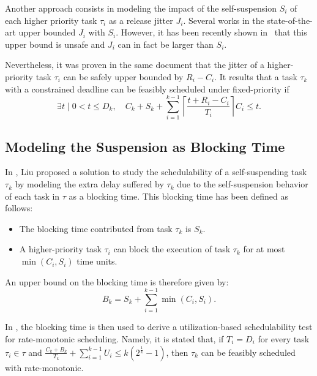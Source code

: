\documentclass[10pt,conference,preprint]{IEEEtran}
\newcommand{\ceiling}[1]{\left\lceil{#1}\right\rceil}
\begin{document}
Another approach consists in modeling the impact of the self-suspension $S_i$ of each higher priority task $\tau_i$ as a release jitter $J_i$. Several works in the state-of-the-art \cite{ECRTS-AudsleyB04,RTAS-AudsleyB04,RTCSA-KimCPKH95,MingLiRTCSA1994} upper bounded $J_i$ with $S_i$. However, it has been recently shown in~\cite{BletsasReport2015} that this upper bound is unsafe and $J_i$ can in fact be larger than $S_i$. 

Nevertheless, it was proven in the same document \cite{BletsasReport2015} that the jitter of a higher-priority task $\tau_i$ can be safely upper bounded by $R_i-C_i$. It results that a task
$\tau_k$ with a constrained deadline can be feasibly scheduled under fixed-priority if
\begin{equation}
\label{eq:TDA-jitter}
\exists t \mid 0 < t \leq D_k, \quad C_k + S_k + \sum_{i=1}^{k-1}\ceiling{\frac{t+R_i-C_i}{T_i}} C_i \leq t.
\end{equation}

\subsection{Modeling the Suspension as Blocking Time}
\label{sec:suspension-blocking}

In \cite[p. 164-165]{Liu:2000:RS:518501}, Liu proposed a solution to study the schedulability of a self-suspending task $\tau_k$ by modeling the extra delay suffered by $\tau_k$ due to the self-suspension behavior of each task in $\tau$ as a blocking time. This blocking time has been defined as follows:
\begin{itemize}
\item The blocking time contributed from task $\tau_k$ is $S_k$. 
\item A higher-priority task $\tau_i$ can block the execution of task $\tau_k$ for at most $\min(C_i, S_i)$ time units.
\end{itemize}
An upper bound on the blocking time is therefore given by:
\begin{equation}
\label{eq:Bk}
B_k = S_k + \sum_{i=1}^{k-1} \min(C_i, S_i).
\end{equation}

In \cite{Liu:2000:RS:518501}, the blocking time is then used to derive a utilization-based schedulability test for rate-monotonic scheduling. Namely, it is stated that, if $T_i=D_i$ for every task $\tau_i \in \tau$ and $\frac{C_k+B_k}{T_k} + \sum_{i=1}^{k-1} U_i \leq k (2^{\frac{1}{k}}-1)$, then $\tau_k$ can be feasibly scheduled with rate-monotonic. 
  
\end{document}
